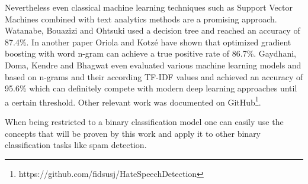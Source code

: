 \noindent
Nevertheless even classical machine learning techniques such as Support Vector Machines combined with text analytics methods are a promising approach.
Watanabe, Bouazizi and Ohtsuki \cite{Watanabe.2018} used a decision tree and reached an accuracy of 87.4\%. In another paper Oriola and Kotzé \cite{Oriola.2020} have shown that optimized gradient boosting with word n-gram can achieve a true positive rate of 86.7\%. Gaydhani, Doma, Kendre and Bhagwat \cite{AdityaGaydhani.2018} even evaluated various machine learning models and based on n-grams and their according TF-IDF values and achieved an accuracy of 95.6\% which can definitely compete with modern deep learning approaches until a certain threshold. Other relevant work was documented on GitHub\footnote{https://github.com/fidsusj/HateSpeechDetection}. 

When being restricted to a binary classification model one can easily use the concepts that will be proven by this work and apply it to other binary classification tasks like spam detection.